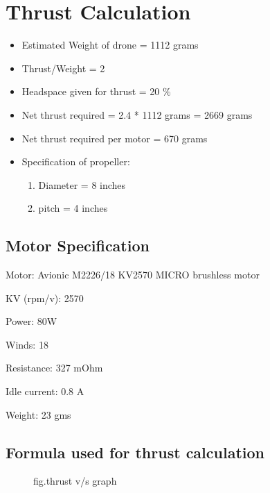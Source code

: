 \documentclass[8pt]{report}
\begin{document}
\section{Thrust Calculation}

\begin{itemize}

\item Estimated Weight of drone = 1112 grams

\item Thrust/Weight = 2

\item Headspace given for thrust = 20 \%

\item Net thrust required = 2.4 * 1112 grams = 2669 grams

\item Net thrust required per motor = 670 grams

\item Specification of propeller:
\begin{enumerate}
\item Diameter = 8 inches
\item pitch = 4 inches
\end{enumerate}
\end{itemize}

\subsection{Motor Specification}

Motor: Avionic M2226/18 KV2570 MICRO brushless motor

KV (rpm/v): 2570

Power: 80W

Winds: 18

Resistance: 327 mOhm

Idle current: 0.8 A

Weight: 23 gms



\subsection{Formula used for thrust calculation}

\begin{figure}[h!]
\centering

\label{fig:boat}
\end{figure}


\begin{figure}[h!]
\centering

\caption{fig.thrust v/s graph}
\label{fig:boat}
\end{figure}
\end{document}
